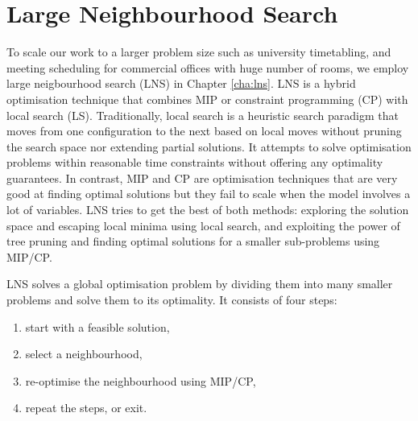 \section{Large Neighbourhood Search}\label{sec:lns:concept}

To scale our work to a larger problem size such as university timetabling, and meeting scheduling for commercial offices with huge number of rooms, we employ large neigbourhood search (LNS) in Chapter \ref{cha:lns}. LNS \citep{shaw1998using} is a hybrid optimisation technique that combines MIP or constraint programming (CP) \citep{rossi2006handbook,hentenryck2009constraint} with local search (LS). Traditionally, local search is a heuristic search paradigm that moves from one configuration to the next based on local moves without pruning the search space nor extending partial solutions. It attempts to solve optimisation problems within reasonable time constraints without offering any optimality guarantees. In contrast, MIP and CP are optimisation techniques that are very good at finding optimal solutions but they fail to scale when the model involves a lot of variables. LNS tries to get the best of both methods: exploring the solution space and escaping local minima using local search, and exploiting the power of tree pruning and finding optimal solutions for a smaller sub-problems using MIP/CP.

\newpage
LNS solves a global optimisation problem by dividing them into many smaller problems and solve them to its optimality. It consists of four steps:
\begin{enumerate}
	\item start with a feasible solution,
	\item select a neighbourhood,
	\item re-optimise the neighbourhood using MIP/CP,
	\item repeat the steps, or exit.
\end{enumerate}

